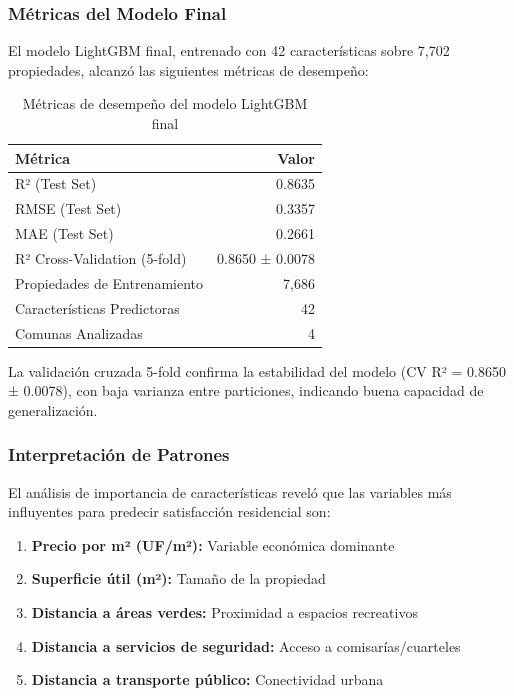 \subsubsection{Métricas del Modelo Final}

El modelo LightGBM final, entrenado con 42 características sobre 7,702 propiedades, alcanzó las siguientes métricas de desempeño:

\begin{table}[H]
\centering
\caption{Métricas de desempeño del modelo LightGBM final}
\begin{tabular}{@{}lr@{}}
\toprule
\textbf{Métrica} & \textbf{Valor} \\
\midrule
R² (Test Set) & 0.8635 \\
RMSE (Test Set) & 0.3357 \\
MAE (Test Set) & 0.2661 \\
R² Cross-Validation (5-fold) & 0.8650 ± 0.0078 \\
Propiedades de Entrenamiento & 7,686 \\
Características Predictoras & 42 \\
Comunas Analizadas & 4 \\
\bottomrule
\end{tabular}
\end{table}

La validación cruzada 5-fold confirma la estabilidad del modelo (CV R² = 0.8650 ± 0.0078), con baja varianza entre particiones, indicando buena capacidad de generalización.

\subsubsection{Interpretación de Patrones}

El análisis de importancia de características reveló que las variables más influyentes para predecir satisfacción residencial son:

\begin{enumerate}
    \item \textbf{Precio por m² (UF/m²):} Variable económica dominante
    \item \textbf{Superficie útil (m²):} Tamaño de la propiedad
    \item \textbf{Distancia a áreas verdes:} Proximidad a espacios recreativos
    \item \textbf{Distancia a servicios de seguridad:} Acceso a comisarías/cuarteles
    \item \textbf{Distancia a transporte público:} Conectividad urbana
\end{enumerate}

